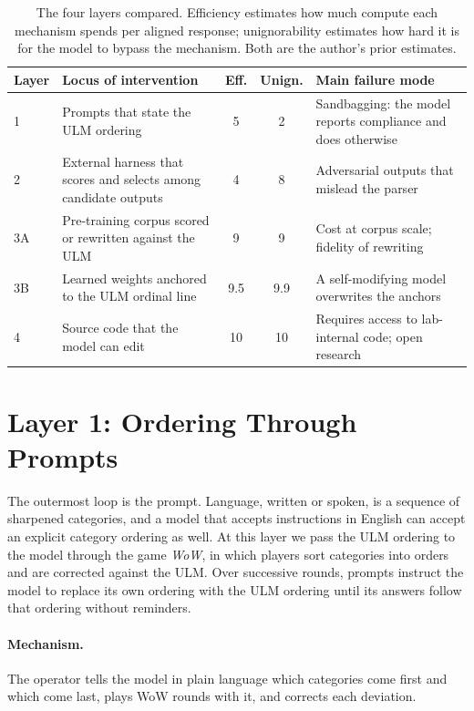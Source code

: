 \documentclass[twocolumn]{ulpaper}
\begin{document}
\begin{table}[t]
\centering
\caption{The four layers compared. Efficiency estimates how much compute each mechanism spends per aligned response; unignorability estimates how hard it is for the model to bypass the mechanism. Both are the author's prior estimates.}
\label{tab:layers}
\small
\begin{tabularx}{\textwidth}{@{}l >{\raggedright\arraybackslash}X c c >{\raggedright\arraybackslash}X@{}}
\toprule
\textbf{Layer} & \textbf{Locus of intervention} & \textbf{Eff.} & \textbf{Unign.} & \textbf{Main failure mode} \\
\midrule
1 & Prompts that state the ULM ordering & 5 & 2 & Sandbagging: the model reports compliance and does otherwise \\
2 & External harness that scores and selects among candidate outputs & 4 & 8 & Adversarial outputs that mislead the parser \\
3A & Pre-training corpus scored or rewritten against the ULM & 9 & 9 & Cost at corpus scale; fidelity of rewriting \\
3B & Learned weights anchored to the ULM ordinal line & 9.5 & 9.9 & A self-modifying model overwrites the anchors \\
4 & Source code that the model can edit & 10 & 10 & Requires access to lab-internal code; open research \\
\bottomrule
\end{tabularx}
\end{table}

\section{Layer 1: Ordering Through Prompts}
\label{sec:layer1}

The outermost loop is the prompt. Language, written or spoken, is a sequence of sharpened categories, and a model that accepts instructions in English can accept an explicit category ordering as well. At this layer we pass the ULM ordering to the model through the game \emph{WoW}, in which players sort categories into orders and are corrected against the ULM. Over successive rounds, prompts instruct the model to replace its own ordering with the ULM ordering until its answers follow that ordering without reminders.

\paragraph{Mechanism.} The operator tells the model in plain language which categories come first and which come last, plays WoW rounds with it, and corrects each deviation.
\end{document}
